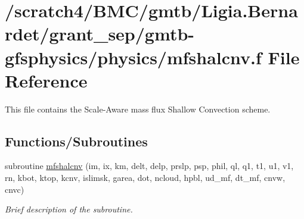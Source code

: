 \hypertarget{mfshalcnv_8f}{}\section{/scratch4/\+B\+M\+C/gmtb/\+Ligia.Bernardet/grant\+\_\+sep/gmtb-\/gfsphysics/physics/mfshalcnv.f File Reference}
\label{mfshalcnv_8f}


This file contains the Scale-\/\+Aware mass flux Shallow Convection scheme.  


\subsection*{Functions/\+Subroutines}
{\bf }\par
\begin{DoxyCompactItemize}
\item 
subroutine \hyperlink{group___s_a_s_h_a_l_ga1daf095191e839740ef858e28d980e7b}{mfshalcnv} (im, ix, km, delt, delp, prslp, psp, phil, ql,                                           q1, t1, u1, v1, rn, kbot, ktop, kcnv, islimsk, garea,                                                                               dot, ncloud, hpbl, ud\+\_\+mf, dt\+\_\+mf, cnvw, cnvc)
\begin{DoxyCompactList}\small\item\em Brief description of the subroutine. \end{DoxyCompactList}\end{DoxyCompactItemize}

